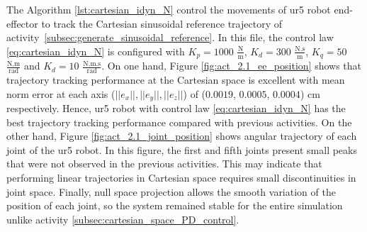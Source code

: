 The Algorithm \ref{lst:cartesian_idyn_N} control the movements of ur5 robot end-effector to track the Cartesian sinusoidal reference trajectory of activity~\ref{subsec:generate_sinusoidal_reference}. In this file, the control law \eqref{eq:cartesian_idyn_N} is configured with ${K_{p}}=1000$ $\mathrm{\frac{N}{m}}$, $K_{d}= 300$ $\mathrm{\frac{N.s}{m}}$, ${K_{q}}=50$ $\mathrm{\frac{N.m}{rad}}$ and $K_{d}= 10$ $\mathrm{\frac{N.m.s}{rad}}$. On one hand, Figure \ref{fig:act_2.1_ee_position} shows that trajectory tracking performance at the Cartesian space is excellent with mean norm error at each axis ($||e_x||, ||e_y||, ||e_z||$) of ($0.0019$, $0.0005$, $0.0004$) cm respectively. Hence, ur5 robot with control law \ref{eq:cartesian_idyn_N} has the best trajectory tracking performance compared with previous activities. On the other hand, Figure \ref{fig:act_2.1_joint_position} shows angular trajectory of each joint of the ur5 robot. In this figure, the first and fifth joints present small peaks that were not observed in the previous activities. This may indicate that performing linear trajectories in Cartesian space requires small discontinuities in joint space. Finally, null space projection allows the smooth variation of the position of each joint, so the system remained stable for the entire simulation unlike activity \ref{subsec:cartesian_space_PD_control}. \vspace{.5cm}


